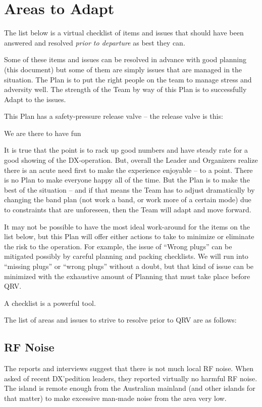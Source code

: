 \documentclass[11pt]{article}
\begin{document}
\section{Areas to Adapt}

The list below is a virtual checklist of items and issues that should
have been answered and resolved {\textit{prior to departure}} as best
they can.
\par
Some of these items and issues can be resolved in advance with good
planning (this document) but some of them are simply issues that
are managed in the situation.  The Plan is to put the right people
on the team to manage stress and adversity well.  The strength
of the Team by way of this Plan is to successfully Adapt to the issues.
\par
This Plan has a safety-pressure release valve -- the release valve is this:
\par
{\large{We are there to have fun}}
\par
It is true that the point is to rack up good numbers and have steady
rate for a good showing of the DX-operation.  But, overall the Leader
and Organizers realize there is an acute need first to make the
experience enjoyable -- to a point.  There is no Plan to make everyone
happy all of the time.  But the Plan is to make the best of the situation --
and if that means the Team has to adjust dramatically by changing the band
plan (not work a band, or work more of a certain mode) due to constraints
that are unforeseen, then the Team will adapt and move forward.
\par
It may not be possible to have the most ideal work-around for the items
on the list below, but this Plan will offer either actions
to take to minimize or eliminate the risk to the operation.  For example,
the issue of ``Wrong plugs'' can be mitigated possibly by careful planning
and packing checklists.  We will run into ``missing plugs'' or ``wrong plugs''
without a doubt, but that kind of issue can be minimized with the 
exhaustive amount of Planning that must take place before QRV.  
\par
A checklist is a powerful tool.
\par
The list of areas and issues to strive to resolve prior to QRV are as follows:
\par
\subsection{RF Noise}
 The reports and interviews suggest that there is not
much local RF noise.  When asked of recent DX'pedition leaders, they reported
virtually no harmful RF noise.  The island is remote enough 
from the Australian mainland (and other islands for that matter) to make
excessive man-made noise from the area very low.
\end{document}
